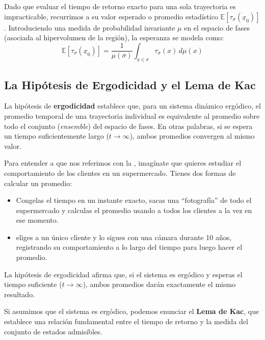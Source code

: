 Dado que evaluar el tiempo de retorno exacto para una sola trayectoria es impracticable, recurrimos a su valor esperado o promedio estadístico $\mathbb{E}[\tau_\sigma(\underline{x}_0)]$. Introduciendo una medida de probabilidad invariante $\mu$ en el espacio de fases (asociada al hipervolumen de la región), la esperanza se modela como:
\begin{equation}
    \mathbb{E}[\tau_\sigma(\underline{x}_0)] = \frac{1}{\mu(\sigma)} \int_{\underline{x} \in \sigma} \tau_\sigma(x) \, d\mu(x)
\end{equation}

\subsection{La Hipótesis de Ergodicidad y el Lema de Kac}

\begin{definicion}
    La hipótesis de \textbf{ergodicidad} establece que, para un sistema dinámico ergódico, el promedio temporal de una trayectoria individual es equivalente al promedio sobre todo el conjunto (\textit{ensemble}) del espacio de fases. En otras palabras, si se espera un tiempo suficientemente largo ($t \to \infty$), ambos promedios convergen al mismo valor.
\end{definicion}

\begin{ejemplo}
    Para entender a que nos referimos con la , imagínate que quieres estudiar el comportamiento de los clientes en un supermercado. Tienes dos formas de calcular un promedio:  
    \begin{itemize}
        \item {} Congelas el tiempo en un instante exacto, sacas una ``fotografía'' de todo el supermercado y calculas el promedio usando a todos los clientes a la vez en ese momento.
        \item {} eliges a un único cliente y lo sigues con una cámara durante 10 años, registrando su comportamiento a lo largo del tiempo para luego hacer el promedio.
    \end{itemize}
    La hipótesis de ergodicidad afirma que, si el sistema es ergódico y esperas el tiempo suficiente ($t \to \infty$), ambos promedios darán exactamente el mismo resultado. \\
\end{ejemplo}
\noindent
Si asumimos que el sistema es ergódico, podemos enunciar el \textbf{Lema de Kac}, que establece una relación fundamental entre el tiempo de retorno y la medida del conjunto de estados admisibles.

